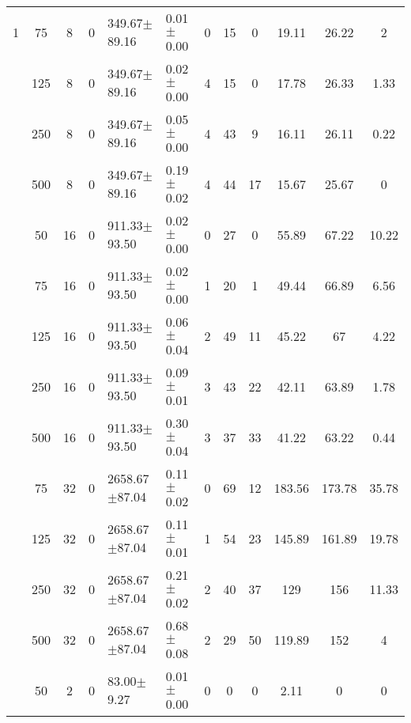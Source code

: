 \documentclass[12pt]{article}
\begin{document}
\begin{table}[h]
\begin{center}
\begin{tabular}{c c c c l l c c c c c c}
1&75      &  8   &    0  &  349.67$\pm$89.16    &        0.01$\pm$0.00  &  0  &          15  &            0   &         19.11   &       26.22   &  2       \\
 &125     &  8   &    0  &  349.67$\pm$89.16    &        0.02$\pm$0.00  &  4  &          15  &            0   &         17.78   &       26.33   &  1.33    \\
 &250     &  8   &    0  &  349.67$\pm$89.16    &        0.05$\pm$0.00  &  4  &          43  &            9   &         16.11   &       26.11   &  0.22    \\
 &500     &  8   &    0  &  349.67$\pm$89.16    &        0.19$\pm$0.02  &  4  &          44  &            17  &         15.67   &       25.67   &  0       \\
 &50      &  16  &    0  &  911.33$\pm$93.50    &        0.02$\pm$0.00  &  0  &          27  &            0   &         55.89   &       67.22   &  10.22   \\
 &75      &  16  &    0  &  911.33$\pm$93.50    &        0.02$\pm$0.00  &  1  &          20  &            1   &         49.44   &       66.89   &  6.56    \\
 &125     &  16  &    0  &  911.33$\pm$93.50    &        0.06$\pm$0.04  &  2  &          49  &            11  &         45.22   &       67      &  4.22    \\
 &250     &  16  &    0  &  911.33$\pm$93.50    &        0.09$\pm$0.01  &  3  &          43  &            22  &         42.11   &       63.89   &  1.78    \\
 &500     &  16  &    0  &  911.33$\pm$93.50    &        0.30$\pm$0.04  &  3  &          37  &            33  &         41.22   &       63.22   &  0.44    \\
 &75      &  32  &    0  &  2658.67$\pm$87.04   &        0.11$\pm$0.02  &  0  &          69  &            12  &         183.56  &       173.78  &  35.78   \\
 &125     &  32  &    0  &  2658.67$\pm$87.04   &        0.11$\pm$0.01  &  1  &          54  &            23  &         145.89  &       161.89  &  19.78   \\
 &250     &  32  &    0  &  2658.67$\pm$87.04   &        0.21$\pm$0.02  &  2  &          40  &            37  &         129     &       156     &  11.33   \\
 &500     &  32  &    0  &  2658.67$\pm$87.04   &        0.68$\pm$0.08  &  2  &          29  &            50  &         119.89  &       152     &  4       \\
 \hline
 &50      &  2   &    0  &  83.00$\pm$9.27      &        0.01$\pm$0.00  &  0  &          0   &            0   &         2.11    &       0       &  0       \\

\end{tabular}
\end{center}
\end{table}
\end{document}
